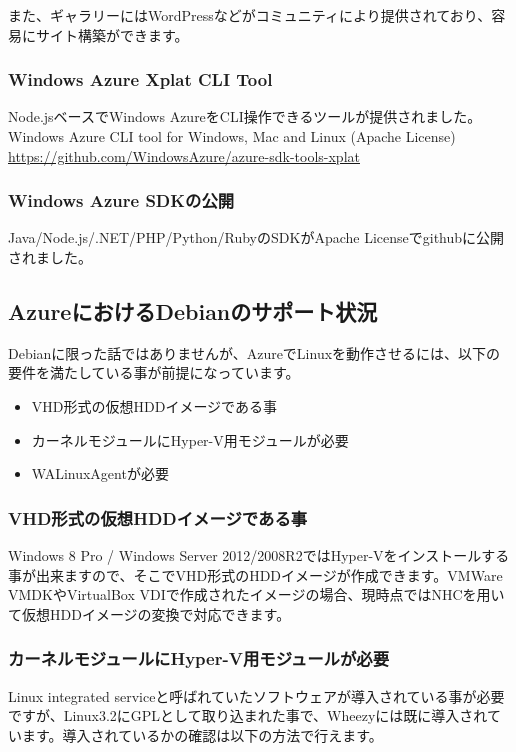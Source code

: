 \documentclass[mingoth,a4paper,twoside]{jsarticle}
\begin{document}
また、ギャラリーにはWordPressなどがコミュニティにより提供されており、容易にサイト構築ができます。

\subsubsection{Windows Azure Xplat CLI Tool}

Node.jsベースでWindows AzureをCLI操作できるツールが提供されました。
Windows Azure CLI tool for Windows, Mac and Linux (Apache License)
\url{https://github.com/WindowsAzure/azure-sdk-tools-xplat}

\subsubsection{Windows Azure SDKの公開}

Java/Node.js/.NET/PHP/Python/RubyのSDKがApache Licenseでgithubに公開されました。
\subsection{AzureにおけるDebianのサポート状況}

Debianに限った話ではありませんが、AzureでLinuxを動作させるには、以下の要件を満たしている事が前提になっています。
\begin{itemize}
\item VHD形式の仮想HDDイメージである事
\item カーネルモジュールにHyper-V用モジュールが必要
\item WALinuxAgentが必要
\end{itemize}


\subsubsection{VHD形式の仮想HDDイメージである事}

Windows 8 Pro / Windows Server 2012/2008R2ではHyper-Vをインストールする事が出来ますので、そこでVHD形式のHDDイメージが作成できます。VMWare VMDKやVirtualBox VDIで作成されたイメージの場合、現時点ではNHCを用いて仮想HDDイメージの変換で対応できます。

\subsubsection{カーネルモジュールにHyper-V用モジュールが必要}

Linux integrated serviceと呼ばれていたソフトウェアが導入されている事が必要ですが、Linux3.2にGPLとして取り込まれた事で、Wheezyには既に導入されています。導入されているかの確認は以下の方法で行えます。
\end{document}

